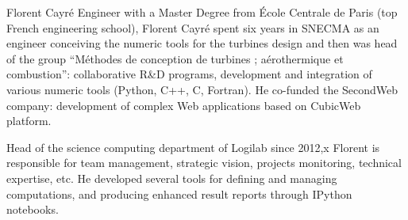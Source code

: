 \begin{participant}[type=PI,PM=2]{Florent Cayré}
  Engineer with a Master Degree from École Centrale de Paris (top
  French engineering school), Florent Cayré spent six years in SNECMA
  as an engineer conceiving the numeric tools for the turbines design
  and then was head of the group ``Méthodes de conception de turbines
  ; aérothermique et combustion'': collaborative R\&D programs,
  development and integration of various numeric tools (Python, C++,
  C, Fortran). He co-funded the SecondWeb company: development of
  complex Web applications based on CubicWeb platform.

  Head of the science computing department of Logilab since 2012,x
  Florent is responsible for team management, strategic vision,
  projects monitoring, technical expertise, etc. He developed several
  tools for defining and managing computations, and producing enhanced
  result reports through IPython notebooks.
\end{participant}
